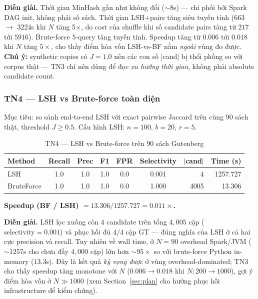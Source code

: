 \textbf{Diễn giải.} Thời gian MinHash gần như không đổi ($\sim 8$s) --- chi phối bởi Spark DAG init, không phải số sách. Thời gian LSH+pairs tăng siêu tuyến tính (663 $\rightarrow$ 3224s khi $N$ tăng 5$\times$, do cost của shuffle khi số candidate pairs tăng từ $217$ tới $5916$). Brute-force $5$-query tăng tuyến tính. Speedup tăng từ $0.006$ tới $0.018$ khi $N$ tăng $5\times$, cho thấy điểm hòa vốn LSH-vs-BF nằm \emph{ngoài} vùng đo được. \textbf{Chú ý:} synthetic copies có $J = 1.0$ nên các con số $|$cand$|$ bị thổi phồng so với corpus thật --- TN3 chỉ nên dùng để đọc \emph{xu hướng thời gian}, không phải absolute candidate count.

\subsubsection{TN4 --- LSH vs Brute-force toàn diện}

Mục tiêu: so sánh end-to-end LSH với exact pairwise Jaccard trên cùng $90$ sách thật, threshold $J \geq 0.5$. Cấu hình LSH: $n=100$, $b=20$, $r=5$.

\begin{table}[H]
\centering
\caption{TN4 --- LSH vs Brute-force trên $90$ sách Gutenberg}
\label{tab:tn4-results}
\begin{tabular}{lcccccrr}
\toprule
\textbf{Method} & \textbf{Recall} & \textbf{Prec} & \textbf{F1} & \textbf{FPR} & \textbf{Selectivity} & \textbf{$|$cand$|$} & \textbf{Time (s)} \\
\midrule
LSH        & 1.0 & 1.0 & 1.0 & 0.0 & 0.001 & 4    & 1257.727 \\
BruteForce & 1.0 & 1.0 & 1.0 & 0.0 & 1.000 & 4005 & 13.306   \\
\bottomrule
\end{tabular}
\end{table}

\textbf{Speedup (BF / LSH) $= 13.306 / 1257.727 = 0.011\times$.}

\textbf{Diễn giải.} LSH lọc xuống còn $4$ candidate trên tổng $4{,}005$ cặp ($\text{selectivity} = 0.001$) và phục hồi đủ $4/4$ cặp GT --- đúng nghĩa của LSH ở cả hai cực precision và recall. Tuy nhiên về wall time, ở $N = 90$ overhead Spark/JVM ($\sim 1257$s cho chưa đầy $4{,}000$ cặp) lớn hơn $\sim 95\times$ so với brute-force Python in-memory ($13.3$s). Đây là kết quả \emph{kỳ vọng được} ở vùng overhead-dominated; TN3 cho thấy speedup tăng monotone với $N$ ($0.006 \rightarrow 0.018$ khi $N: 200 \rightarrow 1000$), gợi ý điểm hòa vốn ở $N \gg 1000$ (xem Section~\ref{sec:plan} cho hướng phục hồi infrastructure để kiểm chứng).

